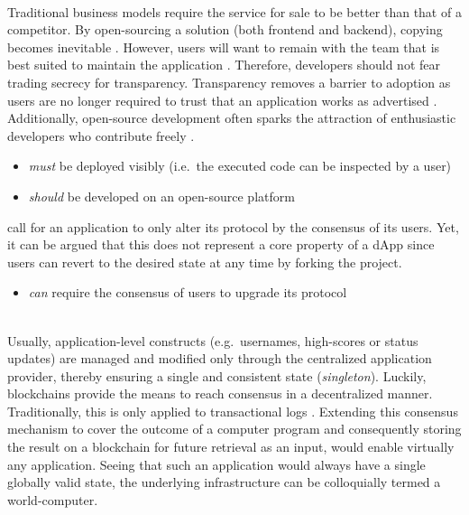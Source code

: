 \begin{description}[format={\storedescriptionlabel}]
	\item[Open-source]
	\hfill \\	
	Traditional business models require the service for sale to be better than that of a competitor. By open-sourcing a solution (both frontend and backend), copying becomes inevitable \cite[p.~10]{Raval.2016}. However, users will want to remain with the team that is best suited to maintain the application \cite[p.~11]{Raval.2016}. Therefore, developers should not fear trading secrecy for transparency. Transparency removes a barrier to adoption as users are no longer required to trust that an application works as advertised \cite[p.~9]{Raval.2016}. Additionally, open-source development often sparks the attraction of enthusiastic developers who contribute freely \cite[p.~11]{Raval.2016}.
	
	\begin{itemize}
  		\item \textit{must} be deployed visibly (i.e.~the executed code can be inspected by a user)
  		\item \textit{should} be developed on an open-source platform
	\end{itemize}
	
	\citeauthor{Johnston2015} call for an application to only alter its protocol by the consensus of its users. Yet, it can be argued that this does not represent a core property of a \ac{dApp} since users can revert to the desired state at any time by forking the project.

	\begin{itemize}
  		\item \textit{can} require the consensus of users to upgrade its protocol
	\end{itemize}

	\item[Decentralized \label{decentralizedConsensus} consensus]
	\hfill \\
	Usually, application-level constructs (e.g.~usernames, high-scores or status updates) are managed and modified only through the centralized application provider, thereby ensuring a single and consistent state (\textit{singleton}). Luckily, blockchains provide the means to reach consensus in a decentralized manner. Traditionally, this is only applied to transactional logs \cite[p.~1]{bitcoin}. Extending this consensus mechanism to cover the outcome of a computer program and consequently storing the result on a blockchain for future retrieval as an input, would enable virtually any application. Seeing that such an application would always have a single globally valid state, the underlying infrastructure can be colloquially termed a world-computer.
	

\end{description}
